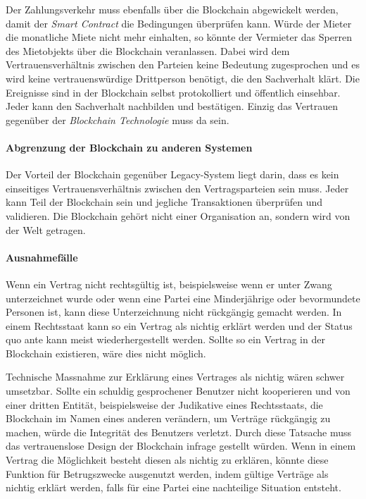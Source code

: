 Der Zahlungsverkehr muss ebenfalls über die Blockchain abgewickelt werden, damit der \emph{Smart Contract} die Bedingungen überprüfen kann.
Würde der Mieter die monatliche Miete nicht mehr einhalten, so könnte der Vermieter das Sperren des Mietobjekts über die Blockchain veranlassen. Dabei wird dem Vertrauensverhältnis zwischen den Parteien keine Bedeutung zugesprochen und es wird keine vertrauenswürdige Drittperson benötigt, die den Sachverhalt klärt. Die Ereignisse sind in der Blockchain selbst protokolliert und öffentlich einsehbar. Jeder kann den Sachverhalt nachbilden und bestätigen. Einzig das Vertrauen gegenüber der \emph{Blockchain Technologie} muss da sein.

\paragraph{Abgrenzung der Blockchain zu anderen Systemen}
Der Vorteil der Blockchain gegenüber Legacy-System liegt darin, dass es kein einseitiges Vertrauensverhältnis zwischen den Vertragsparteien sein muss. Jeder kann Teil der Blockchain sein und jegliche Transaktionen überprüfen und validieren. Die Blockchain gehört nicht einer Organisation an, sondern wird von der Welt getragen.

\paragraph{Ausnahmefälle}
Wenn ein Vertrag nicht rechtsgültig ist, beispielsweise wenn er unter Zwang unterzeichnet wurde oder wenn eine Partei eine Minderjährige oder bevormundete Personen ist, kann diese Unterzeichnung nicht rückgängig gemacht werden. In einem Rechtsstaat kann so ein Vertrag als nichtig erklärt werden und der Status quo ante kann meist wiederhergestellt werden. Sollte so ein Vertrag in der Blockchain existieren, wäre dies nicht möglich.

Technische Massnahme zur Erklärung eines Vertrages als nichtig wären schwer umsetzbar. Sollte ein schuldig gesprochener Benutzer nicht kooperieren und von einer dritten Entität, beispielsweise der Judikative eines Rechtsstaats, die Blockchain im Namen eines anderen verändern, um Verträge rückgängig zu machen, würde die Integrität des Benutzers verletzt. Durch diese Tatsache muss das vertrauenslose Design der Blockchain infrage gestellt würden. Wenn in einem Vertrag die Möglichkeit besteht diesen als nichtig zu erklären, könnte diese Funktion für Betrugszwecke ausgenutzt werden, indem gültige Verträge als nichtig erklärt werden, falls für eine Partei eine nachteilige Situation entsteht.

